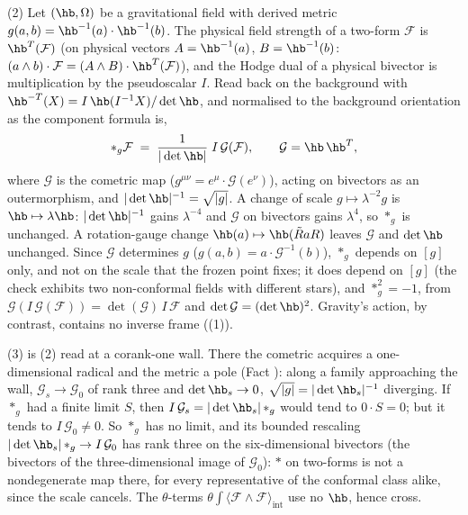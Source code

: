 (2) Let $(\hb, \Omega)$ be a gravitational field with derived metric $g(a,b) = \hb^{-1}(a)\cdot\hb^{-1}(b)$. The physical field strength of a two-form $\mathcal{F}$ is $\hb^{T}(\mathcal{F})$ (on physical vectors $A = \hb^{-1}(a)$, $B = \hb^{-1}(b)$: $(a\wedge b)\cdot\mathcal{F} = (A\wedge B)\cdot\hb^{T}(\mathcal{F})$), and the Hodge dual of a physical bivector is multiplication by the pseudoscalar $I$. Read back on the background with $\hb^{-T}(X) = I\,\hb(I^{-1}X)/\det\hb$, and normalised to the background orientation as the component formula is,
\[
{*}_{g}\mathcal{F} \;=\; \frac{1}{|\det\hb|}\; I\,\mathcal{G}(\mathcal{F}), \qquad \mathcal{G} = \hb\,\hb^{T},
\]
where $\mathcal{G}$ is the cometric map ($g^{\mu\nu} = e^{\mu}\cdot\mathcal{G}(e^{\nu})$), acting on bivectors as an outermorphism, and $|\det\hb|^{-1} = \sqrt{|g|}$. A change of scale $g \mapsto \lambda^{-2}g$ is $\hb \mapsto \lambda\hb$: $|\det\hb|^{-1}$ gains $\lambda^{-4}$ and $\mathcal{G}$ on bivectors gains $\lambda^{4}$, so ${*}_{g}$ is unchanged. A rotation-gauge change $\hb(a) \mapsto \hb(\tilde R aR)$ leaves $\mathcal{G}$ and $\det\hb$ unchanged. Since $\mathcal{G}$ determines $g$ ($g(a, b) = a\cdot\mathcal{G}^{-1}(b)$), ${*}_{g}$ depends on $[g]$ only, and not on the scale that the frozen point fixes; it does depend on $[g]$ (the check exhibits two non-conformal fields with different stars), and ${*}_{g}^{2} = -1$, from $\mathcal{G}(I\,\mathcal{G}(\mathcal{F})) = \det(\mathcal{G})\,I\,\mathcal{F}$ and $\det\mathcal{G} = (\det\hb)^{2}$. Gravity's action, by contrast, contains no inverse frame ((1)).

(3) is (2) read at a corank-one wall. There the cometric acquires a one-dimensional radical and the metric a pole (Fact ): along a family approaching the wall, $\mathcal{G}_{s} \to \mathcal{G}_{0}$ of rank three and $\det\hb_{s} \to 0$, $\sqrt{|g|} = |\det\hb_{s}|^{-1}$ diverging. If ${*}_{g}$ had a finite limit $S$, then $I\,\mathcal{G}_{s} = |\det\hb_{s}|\,{*}_{g}$ would tend to $0\cdot S = 0$; but it tends to $I\,\mathcal{G}_{0} \neq 0$. So ${*}_{g}$ has no limit, and its bounded rescaling $|\det\hb_{s}|\,{*}_{g} \to I\,\mathcal{G}_{0}$ has rank three on the six-dimensional bivectors (the bivectors of the three-dimensional image of $\mathcal{G}_{0}$): ${*}$ on two-forms is not a nondegenerate map there, for every representative of the conformal class alike, since the scale cancels. The $\theta$-terms $\theta\int\langle\mathcal{F}\wedge\mathcal{F}\rangle_{\mathrm{int}}$ use no $\hb$, hence cross.

